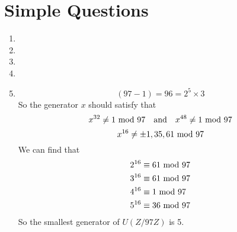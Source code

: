 \documentclass{article}
\renewcommand{\mod}{{\rm\ mod\ }}
\begin{document}
\section{Simple Questions}
\begin{enumerate}
\item
\item
\item
\item
\item
$$(97-1)=96=2^5\times3$$
So the generator $x$ should satisfy that 
$$x^{32}\neq 1\mod 97\quad{\rm and}\quad x^{48}\neq 1\mod 97$$
$$x^{16}\neq \pm 1,35,61\mod 97$$
We can find that
\begin{align*}
2^{16}&\equiv61\mod97\\
3^{16}&\equiv61\mod97\\
4^{16}&\equiv1\mod97\\
5^{16}&\equiv36\mod97
\end{align*}
So the smallest generator of $U(Z/97Z)$ is 5.
\end{enumerate}
\end{document}
